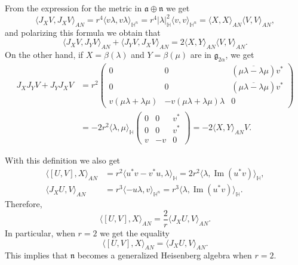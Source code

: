 \documentclass[12pt, a4paper,draft]{amsart}
\newcommand{\g}{\mathfrak}
\renewcommand{\H}{\mathbb{H}}
\renewcommand{\Im}{\operatorname{Im}}
\theoremstyle{remark}
\begin{document}
From the expression for the metric in $\g{a}\oplus\g{n}$ we get
\[
\langle J_X V,J_X V\rangle_{AN}
=r^4\langle v\lambda,v\lambda\rangle_{\H^n}
=r^4\lvert\lambda\rvert_{\H}^2\langle v, v\rangle_{\H^n}
=\langle X,X\rangle_{AN}\langle V, V\rangle_{AN},
\]	
and polarizing this formula we obtain that
\[
	\langle J_{X}V,J_{Y}V\rangle_{AN}+\langle J_{Y}V,J_{X}V\rangle_{AN}=2\langle X,Y\rangle_{AN}\langle V,V\rangle_{AN}.
\]
On the other hand, if $X=\beta(\lambda)$ and $Y=\beta(\mu)$ are in $\g{g}_{2\alpha}$, we get
\[
\begin{aligned}
J_X J_Y V+J_Y J_X V
&{}=r^2\left(
\begin{array}{cc|c}
	0 & 0 & (\overline{\mu\lambda-\lambda\mu})v^{*} \\
	0 & 0 & (\overline{\mu\lambda-\lambda\mu})v^{*} \\
	\hline
	v(\mu\lambda+\lambda\mu) & -v(\mu\lambda+\lambda\mu)\lambda & 0
\end{array}
\right)\\
&{}=-2r^2\langle\lambda,\mu\rangle_{\H} \left(
\begin{array}{cc|c}
	0 & 0 & v^{*} \\
	0 & 0 & v^{*} \\
	\hline
	v  & -v & 0
\end{array}
\right)
=-2\langle X,Y\rangle_{AN} V.
\end{aligned}
\]

With this definition we also get
\[
\begin{aligned}
\langle[U,V],X\rangle_{AN}
&{}=r^2\langle u^*v-v^*u,\lambda\rangle_{\H}
=2r^2\langle\lambda,\Im(u^*v)\rangle_\H,\\
\langle J_X U,V\rangle_{AN}
&{}=r^3\langle -u\lambda,v\rangle_{\H^n}
=r^3\langle\lambda,\Im(u^*v)\rangle_\H.
\end{aligned}
\]
Therefore,
\[
\langle[U,V],X\rangle_{AN}=\frac{2}{r}\langle J_X U,V\rangle_{AN}.
\]	
In particular, when $r=2$ we get the equality
\[
	\langle [U,V],X\rangle_{AN}=\langle J_{X}U,V\rangle_{AN}.
\]
This implies that $\g{n}$ becomes a generalized Heisenberg algebra when $r=2$.
\end{document}
